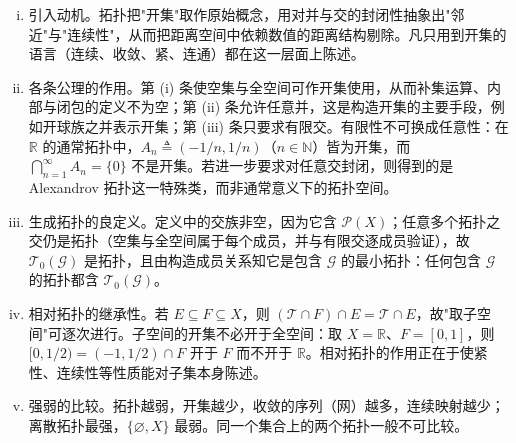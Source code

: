 \documentclass[../main.tex]{subfiles}
\begin{document}
\begin{remark}\label{remark:appA-拓扑基础}
\begin{enumerate}[(i)]
\item 引入动机。拓扑把"开集"取作原始概念，用对并与交的封闭性抽象出"邻近"与"连续性"，从而把距离空间中依赖数值的距离结构剔除。凡只用到开集的语言（连续、收敛、紧、连通）都在这一层面上陈述。
\item 各条公理的作用。第 (i) 条使空集与全空间可作开集使用，从而补集运算、内部与闭包的定义不为空；第 (ii) 条允许任意并，这是构造开集的主要手段，例如开球族之并表示开集；第 (iii) 条只要求有限交。有限性不可换成任意性：在 $\mathbb{R}$ 的通常拓扑中，$A_n\triangleq(-1/n,1/n)$（$n\in\mathbb{N}$）皆为开集，而 $\bigcap_{n=1}^\infty A_n=\{0\}$ 不是开集。若进一步要求对任意交封闭，则得到的是 Alexandrov 拓扑这一特殊类，而非通常意义下的拓扑空间。
\item 生成拓扑的良定义。定义中的交族非空，因为它含 $\mathcal{P}(X)$；任意多个拓扑之交仍是拓扑（空集与全空间属于每个成员，并与有限交逐成员验证），故 $\mathscr{T}_0(\mathscr{G})$ 是拓扑，且由构造成员关系知它是包含 $\mathscr{G}$ 的最小拓扑：任何包含 $\mathscr{G}$ 的拓扑都含 $\mathscr{T}_0(\mathscr{G})$。
\item 相对拓扑的继承性。若 $E\subseteq F\subseteq X$，则 $(\mathscr{T}\cap F)\cap E=\mathscr{T}\cap E$，故"取子空间"可逐次进行。子空间的开集不必开于全空间：取 $X=\mathbb{R}$、$F=[0,1]$，则 $[0,1/2)=(-1,1/2)\cap F$ 开于 $F$ 而不开于 $\mathbb{R}$。相对拓扑的作用正在于使紧性、连续性等性质能对子集本身陈述。
\item 强弱的比较。拓扑越弱，开集越少，收敛的序列（网）越多，连续映射越少；离散拓扑最强，$\{\varnothing ,X\}$ 最弱。同一个集合上的两个拓扑一般不可比较。
\end{enumerate}
\end{remark}
\end{document}
